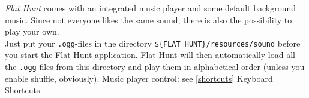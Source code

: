 \emph{Flat Hunt} comes with an integrated music player and some default background music. Since not everyone likes the same sound, there is also the possibility to play your own.\\ 
Just put your \texttt{.ogg}-files in the directory \texttt{\$\{FLAT\_HUNT\}/resources/sound} before you start the Flat Hunt application. Flat Hunt will then automatically load all the \texttt{.ogg}-files from this directory and play them in alphabetical order (unless you enable shuffle, obviously). Music player control: see \ref{shortcuts} Keyboard Shortcuts.
